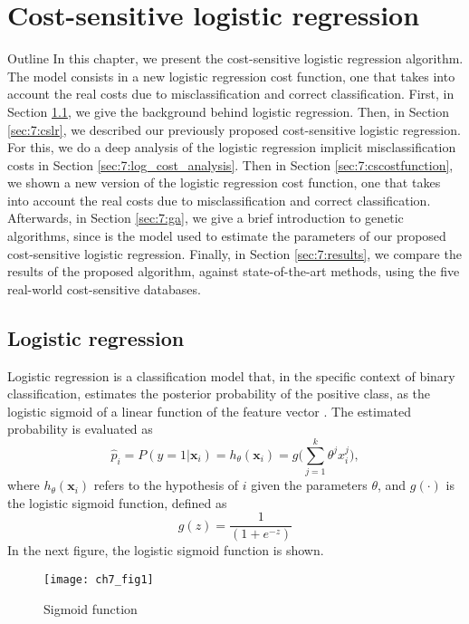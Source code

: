 \chapter{Cost-sensitive logistic regression}\label{ch:7}

\begin{remark}{Outline}
In this chapter, we present the cost-sensitive logistic regression algorithm. The model consists in 
a new logistic regression cost function, one that takes into account the real costs due to 
misclassification and correct classification. First, in Section \ref{sec:7:logistic}, we give the 
background behind logistic regression. Then, in Section \ref{sec:7:cslr}, we described our 
previously proposed cost-sensitive logistic regression. For this, we do a deep analysis of the 
logistic regression implicit misclassification costs in Section \ref{sec:7:log_cost_analysis}. Then 
in Section \ref{sec:7:cscostfunction}, we shown a new version of the logistic regression cost 
function, one that takes into account the real costs due to misclassification and correct 
classification. Afterwards, in Section \ref{sec:7:ga}, we give a brief introduction to genetic 
algorithms, since is the model used to estimate the parameters of our proposed cost-sensitive 
logistic regression. Finally, in Section \ref{sec:7:results}, we compare the results of the proposed 
algorithm, against state-of-the-art methods, using the five real-world cost-sensitive databases.
\end{remark}


\section{Logistic regression}
\label{sec:7:logistic}

Logistic regression is a classification model that, in the specific context of binary 
classification, estimates the posterior probability of the positive class, as the logistic sigmoid 
of a linear function of the feature vector \citep{Bishop2006}. The estimated probability  is 
evaluated as 
\begin{equation}
  \hat p_i = P(y=1 \vert \mathbf{x}_i) = h_{\theta}(\mathbf{x}_i) = 
  g\bigg(\sum_{j=1}^{k}{\theta^jx_i^j}\bigg),
\end{equation}
where $h_\theta(\mathbf{x}_i)$ refers to the hypothesis of $i$ given the parameters $\theta$,  
and  $g(\cdot)$ is the logistic sigmoid function, defined as
\begin{equation}
  g(z)=\frac{1}{(1+e^{-z})} 
\end{equation}
In the next figure, the logistic sigmoid function is shown.
\begin{figure}[htbp]
  \centering
  \texttt{[image: ch7\_fig1]}
  \caption{Sigmoid function}
  \label{fig:ch7:1}
\end{figure}

